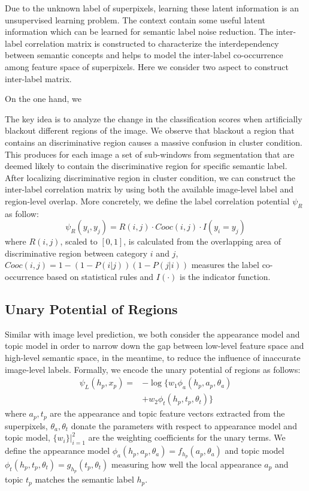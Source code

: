 Due to the unknown label of superpixels, learning these latent information is an unsupervised learning problem. The context contain some useful latent information which can be learned for semantic label noise reduction. The inter-label correlation matrix is constructed to characterize the interdependency between semantic concepts and helps to model the inter-label co-occurrence among feature space of superpixels. Here we consider two aspect to construct inter-label matrix. 

On the one hand, we 

The key idea is to analyze the change in the classification scores when artificially blackout different regions of the image. We observe that blackout a region that contains an discriminative region causes a massive confusion in cluster condition. This produces for each image a set of sub-windows from segmentation that are deemed likely to contain the discriminative region for specific semantic label. After localizing discriminative region in cluster condition, we can construct the inter-label correlation matrix by using both the available image-level label and region-level overlap. More concretely, we define the label correlation potential $\psi_R$ as follow:
\begin{equation}
    \psi_{R}(y_i,y_j) = R(i,j) \cdot Cooc(i,j) \cdot I(y_i=y_j)
\end{equation}
where $R(i,j)$, scaled to $[0,1]$, is calculated from the overlapping area of discriminative region between category $i$ and $j$, $Cooc(i,j) = 1-(1-P(i|j))(1-P(j|i))$ measures the label co-occurrence based on statistical rules and $I(\cdot)$ is the indicator function.

\subsection{Unary Potential of Regions}
Similar with image level prediction, we both consider the appearance model and topic model in order to narrow down the gap between low-level feature space and high-level semantic space, in the meantime, to reduce the influence of inaccurate image-level labels.
Formally, we encode the unary potential of regions as follows:
\begin{equation}
    \begin{aligned}
        \psi_{L}(h_p,x_p) = &- \log \big\{ w_1\phi_a(h_p,a_p,\theta_a) \\
        &+ w_2\phi_t(h_p,t_p,\theta_t) \big\}
    \end{aligned}
\end{equation}
where $a_p, t_p$ are the appearance and topic feature vectors extracted from the superpixels, $\theta_a, \theta_t$ donate the parameters with respect to appearance model and topic model, $\{w_i\}|_{i=1}^2$ are the weighting coefficients for the unary terms. We define the appearance model $\phi_a(h_p,a_p,\theta_a) = f_{h_p}(a_p,\theta_a)$ and topic model $\phi_t(h_p,t_p,\theta_t) = g_{h_p}(t_p,\theta_t)$ measuring how well the local appearance $a_p$ and topic $t_p$ matches the semantic label $h_p$.

